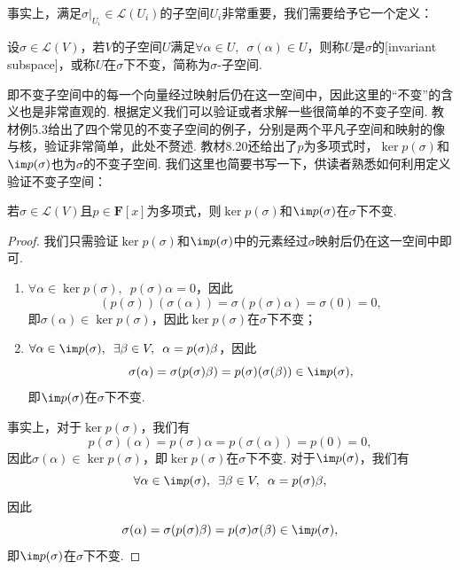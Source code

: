 事实上，满足$\sigma\vert_{U_i}\in\mathcal{L}(U_i)$的子空间$U_i$非常重要，我们需要给予它一个定义：
\begin{definition}
    设$\sigma\in \mathcal{L}(V)$，若$V$的子空间$U$满足$\forall \alpha\in U,\enspace \sigma(\alpha)\in U$，则称$U$是$\sigma$的[invariant subspace]，或称$U$在$\sigma$下不变，简称为$\sigma$-子空间.
\end{definition}
即不变子空间中的每一个向量经过映射后仍在这一空间中，因此这里的``不变''的含义也是非常直观的. 根据定义我们可以验证或者求解一些很简单的不变子空间. 教材例5.3给出了四个常见的不变子空间的例子，分别是两个平凡子空间和映射的像与核，验证非常简单，此处不赘述. 教材8.20还给出了$p$为多项式时，$\ker p(\sigma)$和$\im p(\sigma)$也为$\sigma$的不变子空间. 我们这里也简要书写一下，供读者熟悉如何利用定义验证不变子空间：
\begin{example}
    若$\sigma\in\mathcal{L}(V)$且$p\in\mathbf{F}[x]$为多项式，则$\ker p(\sigma)$和$\im p(\sigma)$在$\sigma$下不变.
\end{example}

\begin{proof}
    我们只需验证$\ker p(\sigma)$和$\im p(\sigma)$中的元素经过$\sigma$映射后仍在这一空间中即可.
    \begin{enumerate}
        \item $\forall \alpha\in \ker p(\sigma),\enspace p(\sigma)\alpha=0$，因此
        \[(p(\sigma))(\sigma(\alpha))=\sigma(p(\sigma)\alpha)=\sigma(0)=0,\]
        即$\sigma(\alpha)\in \ker p(\sigma)$，因此$\ker p(\sigma)$在$\sigma$下不变；

        \item $\forall \alpha\in \im p(\sigma),\enspace \exists \beta\in V,\enspace \alpha=p(\sigma)\beta$，因此
        \[\sigma(\alpha)=\sigma(p(\sigma)\beta)=p(\sigma)(\sigma(\beta))\in \im p(\sigma),\]
        即$\im p(\sigma)$在$\sigma$下不变.
    \end{enumerate}
    事实上，对于$\ker p(\sigma)$，我们有
    \[ p(\sigma)(\alpha)=p(\sigma)\alpha=p(\sigma(\alpha))=p(0)=0,\]
    因此$\sigma(\alpha)\in \ker p(\sigma)$，即$\ker p(\sigma)$在$\sigma$下不变. 对于$\im p(\sigma)$，我们有
    \[\forall \alpha\in \im p(\sigma),\enspace \exists \beta\in V,\enspace \alpha=p(\sigma)\beta,\]
    因此
    \[\sigma(\alpha)=\sigma(p(\sigma)\beta)=p(\sigma)\sigma(\beta)\in \im p(\sigma),\]
    即$\im p(\sigma)$在$\sigma$下不变.
\end{proof}

